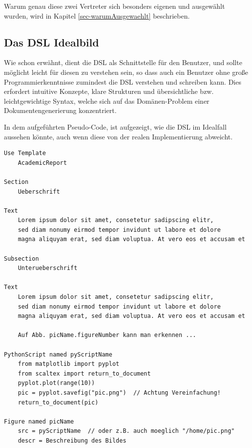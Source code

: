 Warum genau diese zwei Vertreter sich besonders eigenen und ausgewählt wurden,
wird in Kapitel \ref{sec-warumAusgewaehlt} beschrieben.



\subsection{Das DSL Idealbild}

Wie schon erwähnt, dient die DSL als Schnittstelle für den Benutzer,
und sollte möglicht leicht für diesen zu verstehen sein, so dass
auch ein Benutzer ohne große Programmierkenntnisse zumindest die
DSL verstehen und schreiben kann. Dies erfordert intuitive Konzepte,
klare Strukturen und übersichtliche bzw. leichtgewichtige Syntax, welche
sich auf das Domänen-Problem einer Dokumentengenerierung konzentriert.

In dem aufgeführten Pseudo-Code, ist aufgezeigt, wie die DSL im Idealfall
aussehen könnte, auch wenn diese von der realen Implementierung abweicht.

\begin{lstlisting}[language=DSL_ideal]
Use Template
    AcademicReport

Section
    Ueberschrift

Text
    Lorem ipsum dolor sit amet, consetetur sadipscing elitr,
    sed diam nonumy eirmod tempor invidunt ut labore et dolore
    magna aliquyam erat, sed diam voluptua. At vero eos et accusam et

Subsection
    Unterueberschrift

Text
    Lorem ipsum dolor sit amet, consetetur sadipscing elitr,
    sed diam nonumy eirmod tempor invidunt ut labore et dolore
    magna aliquyam erat, sed diam voluptua. At vero eos et accusam et

    Auf Abb. picName.figureNumber kann man erkennen ...

PythonScript named pyScriptName
    from matplotlib import pyplot
    from scaltex import return_to_document
    pyplot.plot(range(10))
    pic = pyplot.savefig("pic.png")  // Achtung Vereinfachung!
    return_to_document(pic)

Figure named picName
    src = pyScriptName  // oder z.B. auch moeglich "/home/pic.png"
    descr = Beschreibung des Bildes
\end{lstlisting}


